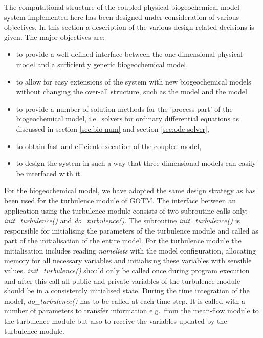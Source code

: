 The computational structure of the coupled physical-biogeochemical
model system implemented here
has been designed under consideration of various objectives. 
In this section  
a description of the various design related decisions is given.
The major objectives are:
\begin{itemize}
  \item to provide a well-defined interface between the one-dimensional
   physical model and a sufficiently generic biogeochemical model,
  \item to allow for easy extensions of the system with new 
     biogeochemical models without changing 
  the over-all structure, such as the \cite{Fashametal1990} model
  and the \cite{Neumannetal2002} model
  \item to provide a number of solution methods for the 'process part' of the
  biogeochemical model, i.e.\ solvers for ordinary differential equations
  as discussed in section \ref{sec:bio-num} and section \ref{sec:ode-solver},
  \item to obtain fast and efficient execution of the coupled model,
  \item to design the system in such a way that three-dimensional 
   models can easily be interfaced with it.
\end{itemize}
For the biogeochemical model,
we have adopted the same design strategy as has been used for the turbulence 
module of GOTM. The interface between an application using the turbulence
module consists of two subroutine calls only: \emph{init\_turbulence()} and
\emph{do\_turbulence()}. The subroutine \emph{init\_turbulence()} is
responsible for initialising the parameters of the turbulence module and  
called as part of the 
initialisation of the entire model. For the turbulence module the 
initialisation includes reading \emph{namelists} with the model configuration, 
allocating memory for all necessary variables and initialising 
these variables with sensible values. \emph{init\_turbulence()} should only be
called once during program execution and after this call all public and private
variables of the turbulence module should be in a 
consistently initialised state.
During the time integration of the model, \emph{do\_turbulence()} has to be
called at each time step. It is called with a number
of parameters to transfer information e.g.\ from the mean-flow module 
to the turbulence module but also to receive the variables updated
by the turbulence module.

